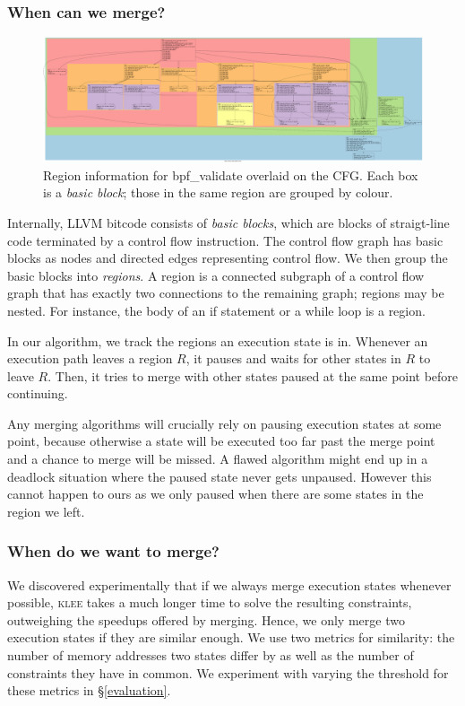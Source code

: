 \documentclass[12pt,a4paper]{article}
\newcommand{\klee}{\textsc{klee }}
\begin{document}
\subsubsection*{When can we merge?}

\begin{figure}
  \centering
    \includegraphics[width=\textwidth]{reg.png}
  \caption{Region information for bpf\_validate overlaid on the CFG. Each box is a \emph{basic block}; those in the same region are grouped by colour.}
\end{figure}

Internally, LLVM bitcode consists of \emph{basic blocks}, which are blocks of straigt-line code terminated by a control flow instruction. The control flow graph has basic blocks as nodes and directed edges representing control flow. We then group the basic blocks into \emph{regions}. A region \cite{regions} is a connected subgraph of a control flow graph that has exactly two connections to the remaining graph; regions may be nested. For instance, the body of an if statement or a while loop is a region.

In our algorithm, we track the regions an execution state is in. Whenever an execution path leaves a region $R$, it pauses and waits for other states in $R$ to leave $R$. Then, it tries to merge with other states paused at the same point before continuing. 

Any merging algorithms will crucially rely on pausing execution states at some point, because otherwise a state will be executed too far past the merge point and a chance to merge will be missed. A flawed algorithm might end up in a deadlock situation where the paused state never gets unpaused. However this cannot happen to ours as we only paused when there are some states in the region we left.

\subsubsection*{When do we want to merge?}
We discovered experimentally that if we always merge execution states whenever possible, \klee takes a much longer time to solve the resulting constraints, outweighing the speedups offered by merging. Hence, we only merge two execution states if they are similar enough. We use two metrics for similarity: the number of memory addresses two states differ by as well as the number of constraints they have in common. We experiment with varying the threshold for these metrics in \S\ref{evaluation}.
\end{document}
